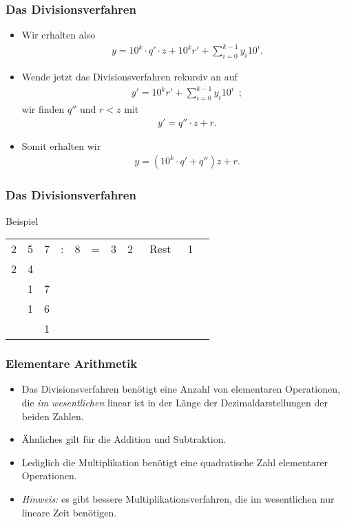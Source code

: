 \documentclass{beamer}
\renewcommand{\emph}[1]{{\textcolor{solarizedRed}{\itshape #1}}}
\renewcommand{\ae}{\"a}
\renewcommand{\oe}{\"o}
\newcommand{\ue}{\"u}
\newcommand{\Ae}{\"A}
\begin{document}
\begin{frame}\frametitle{Das Divisionsverfahren}
	\begin{block}{}
		\begin{itemize}
			\item Wir erhalten also
				\begin{align*}
					y=10^k\cdot q'\cdot z+10^kr'+\sum_{i=0}^{k-1}y_i10^i.
				\end{align*}
			\item Wende jetzt das Divisionsverfahren rekursiv an auf
				\begin{align*}
					y'=10^kr'+\sum_{i=0}^{k-1}y_i10^i\enspace;
				\end{align*}
				wir finden $q''$ und $r<z$ mit
				\begin{align*}
					y'=q''\cdot z+r.
				\end{align*}
			\item Somit erhalten wir
				\begin{align*}
					y=(10^k\cdot q'+q'')z+r.
				\end{align*}
		\end{itemize}
	\end{block}
\end{frame}

\begin{frame}\frametitle{Das Divisionsverfahren}
	\begin{block}{Beispiel}
		\begin{tabular}{ccccccccccc}
			2&5&7&:&8&=&3&2&\mbox{ Rest }&1\\
			2&4\\
			 &1&7\\
			 &1&6\\
			 &&1
		\end{tabular}
	\end{block}
\end{frame}

\begin{frame}\frametitle{Elementare Arithmetik}
	\begin{itemize}
		\item Das Divisionsverfahren ben\oe tigt eine Anzahl von elementaren Operationen, die {\itshape im wesentlichen} linear ist in der L\ae nge der Dezimaldarstellungen der beiden Zahlen.
		\item \Ae hnliches gilt f\ue r die Addition und Subtraktion.
		\item Lediglich die Multiplikation ben\oe tigt eine quadratische Zahl elementarer Operationen.
		\item \emph{Hinweis:} es gibt bessere Multiplikationsverfahren, die im wesentlichen nur lineare Zeit ben\oe tigen.
	\end{itemize}
\end{frame}
\end{document}
